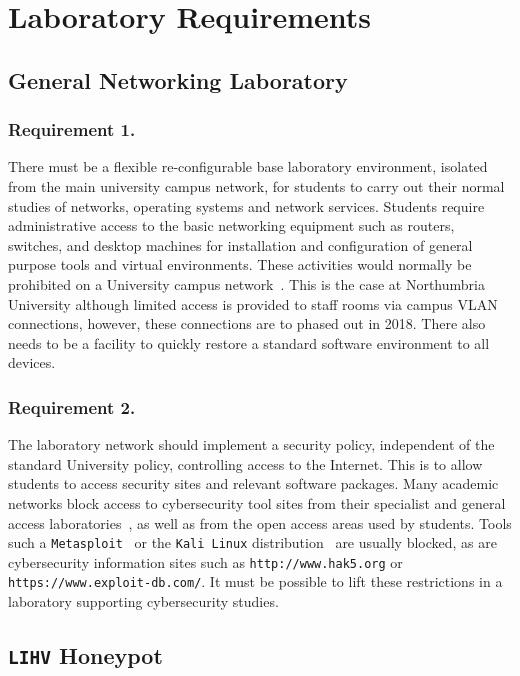 \documentclass[10pt,journal]{IEEEtran}
\begin{document}
\section{Laboratory Requirements}\label{sec:TeachingRequire}

\subsection{General Networking Laboratory}\label{subsec:GeneralLab}

\subsubsection{Requirement 1.} 
There must be a flexible re-configurable base laboratory environment, isolated
from the main university campus network, for students to carry out their normal
studies of networks, operating systems and network services. Students require
administrative access to the basic networking equipment such as routers,
switches, and desktop machines for installation and configuration of general
purpose tools and virtual environments. These activities would normally be
prohibited on a University campus network~\cite{MGDL:13}. This is the case at Northumbria University although limited access is provided to staff rooms via campus VLAN connections, however, these connections are to phased out in 2018. There also needs to be a facility to quickly restore a standard software environment to all devices.

\subsubsection{Requirement 2.}
The laboratory network should implement a security policy, independent of the
standard University policy, controlling access to the Internet. This is to
allow students to access security sites and relevant software packages. Many
academic networks block access to cybersecurity tool sites from their
specialist and general access laboratories~\cite{ACGO:06,YYLCHJ:04}, as well as
from the open access areas used by students. Tools such a
\texttt{Metasploit}~\cite{R7:17} or the \texttt{Kali Linux}
distribution~\cite{OS:17} are usually blocked, as are cybersecurity information
sites such as \texttt{http://www.hak5.org} or
\texttt{https://www.exploit-db.com/}. It must be possible to lift these
restrictions in a laboratory supporting cybersecurity studies.

\subsection{\texttt{LIHV} Honeypot}\label{subsec:LabHoneypot}
\end{document}
